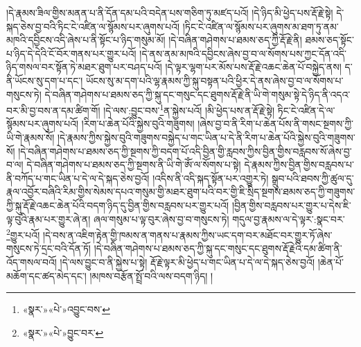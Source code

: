 །དེ་རྣམས་ཟིལ་གྱིས་མནན་པ་ནི་དོན་དམ་པའི་བདེན་པས་གཅིག་ཏུ་མཛད་པའོ། །དེ་ཉིད་མི་ཕྱེད་པས་རྡོ་རྗེ་སྟེ། དེ་སྐད་ཅེས་བྱ་བའི་ཏིང་ངེ་འཛིན་ལ་སྙོམས་པར་ཞུགས་པའོ། །ཏིང་ངེ་འཛིན་ལ་སྙོམས་པར་ཞུགས་མ་ཐག་ཏུ་ནམ་མཁའི་དབྱིངས་འདི་ཞེས་པ་ནི་སྟོང་པ་ཉིད་གསུམ་མོ། །དེ་བཞིན་གཤེགས་པ་ཐམས་ཅད་ཀྱི་རྡོ་རྗེ་ནི། ཐམས་ཅད་སྟོང་པ་ཉིད་དེ་དེའི་ངོ་བོར་གནས་པར་གྱུར་པའོ། །དེ་ནས་ནམ་མཁའི་དབྱིངས་ཞེས་བྱ་བ་ལ་སོགས་པས་ཀྱང་དོན་འདི་ཉིད་གསལ་བར་སྟོན་ཏེ་མཐར་ཐུག་པར་བཤད་པའོ། །དེ་ལྟར་ལྷག་པར་མོས་པས་རྡོ་རྗེ་འཆང་ཆེན་པོ་བསྐྱེད་ནས། ད་ནི་ཡོངས་སུ་དག་པ་དང་། ཡོངས་སུ་མ་དག་པའི་ལྷ་རྣམས་ཀྱི་སྐུ་བསྟན་པའི་ཕྱིར་དེ་ནས་ཞེས་བྱ་བ་ལ་སོགས་པ་གསུངས་ཏེ། དེ་བཞིན་གཤེགས་པ་ཐམས་ཅད་ཀྱི་སྐུ་དང་གསུང་དང་ཐུགས་རྡོ་རྗེ་ནི་ཡི་གེ་གསུམ་སྟེ་དེ་ཉིད་ནི་འདའ་བར་མི་བྱ་བས་ན་དམ་ཚིག་གོ། །དེ་ལས་:བྱུང་བས་\footnote{«སྣར་»«པེ་»འབྱུང་བས་}ན་སྐྱེས་པའོ། །མི་ཕྱེད་པས་ན་རྡོ་རྗེ་སྟེ། ཏིང་ངེ་འཛིན་དེ་ལ་སྙོམས་པར་ཞུགས་པའོ། །རིག་པ་ཆེན་པོའི་སྐྱེས་བུའི་གཟུགས། །ཞེས་བྱ་བ་ནི་རིག་པ་ཆེན་པོས་ནི་གསང་སྔགས་ཀྱི་ཡི་གེ་རྣམས་སོ། །དེ་རྣམས་ཀྱིས་སྐྱེས་བུའི་གཟུགས་བསྐྱེད་པ་གང་ཡིན་པ་དེ་ནི་རིག་པ་ཆེན་པོའི་སྐྱེས་བུའི་གཟུགས་སོ། །དེ་བཞིན་གཤེགས་པ་ཐམས་ཅད་ཀྱི་སྔགས་ཀྱི་བདག་པོ་འདི་བྱིན་གྱི་རླབས་ཀྱིས་བྱིན་གྱིས་བརླབས་སོ་ཞེས་བྱ་བ་ལ། དེ་བཞིན་གཤེགས་པ་ཐམས་ཅད་ཀྱི་སྔགས་ནི་ཡི་གེ་ཨོཾ་ལ་སོགས་པ་སྟེ། དེ་རྣམས་ཀྱིས་བྱིན་གྱིས་བརླབས་པ་ནི་བཀོད་པ་གང་ཡིན་པ་དེ་ལ་དེ་སྐད་ཅེས་བྱའོ། །འདིས་ནི་འདི་སྐད་སྟོན་པར་འགྱུར་ཏེ། སྒྲུབ་པའི་ཐབས་ཀྱི་ཚུལ་དུ་རྣལ་འབྱོར་བཞིའི་རིམ་གྱིས་སེམས་དཔའ་གསུམ་གྱི་མཐར་ཐུག་པའི་བར་གྱི་ཇི་སྲིད་སྔགས་ཐམས་ཅད་ཀྱི་གཟུགས་ཀྱི་སྐུ་རྡོ་རྗེ་འཆང་ཆེན་པོའི་བདག་ཉིད་དུ་བྱིན་གྱིས་བརླབས་པར་གྱུར་པའོ། །བྱིན་གྱིས་བརླབས་པར་གྱུར་པ་དེས་ཇི་ལྟ་བུའི་རྣམ་པར་གྱུར་ཞེ་ན། ཞལ་གསུམ་པ་ལྟ་བུར་ཞེས་བྱ་བ་གསུངས་ཏེ། གདུལ་བྱ་རྣམས་ལ་དེ་ལྟར་:སྣང་བར་\footnote{«སྣར་»«པེ་»བྱུང་བར་}གྱུར་པའོ། །དེ་བས་ན་འཇིག་རྟེན་གྱི་ཁམས་ན་གནས་པ་རྣམས་ཀྱིས་ཡང་དག་བར་མཐོང་བར་གྱུར་ཏོ་ཞེས་གསུངས་ཏེ་དྲང་བའི་དོན་ཏོ། །དེ་བཞིན་གཤེགས་པ་ཐམས་ཅད་ཀྱི་སྐུ་དང་གསུང་དང་ཐུགས་རྡོ་རྗེའི་དམ་ཚིག་ནི་འོད་གསལ་བའོ། །དེ་ལས་བྱུང་བ་ནི་སྐྱེས་པ་སྟེ། རྡོ་རྗེ་ལྟར་མི་ཕྱེད་པ་གང་ཡིན་པ་དེ་ལ་དེ་སྐད་ཅེས་བྱའོ། །ཆེན་པོ་མཆོག་དང་ཚད་མེད་དང་། །མཁས་བརྩོན་སྤྲོ་བའི་ལས་བདག་ཉིད། །

